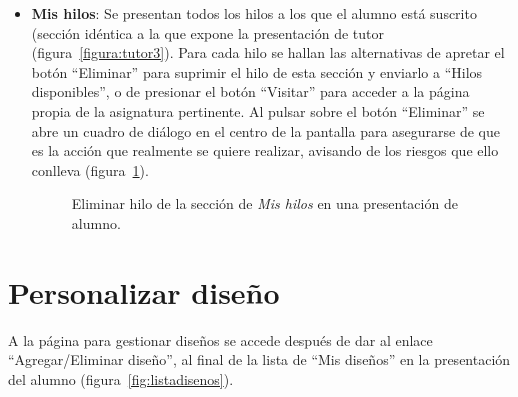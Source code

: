 \documentclass[a4paper, 12pt]{book}
\begin{document}
\begin{itemize}
  \item {\bfseries Mis hilos}: Se presentan todos los hilos a los que el alumno est\'a suscrito (secci\'on id\'entica a la que expone la presentaci\'on de 
  tutor (figura~\ref{figura:tutor3}). Para cada hilo se hallan las alternativas de apretar el bot\'on ``Eliminar'' para suprimir el hilo de esta secci\'on y 
  enviarlo a ``Hilos disponibles'', o de presionar el bot\'on ``Visitar'' para acceder a la p\'agina propia de la asignatura pertinente. Al pulsar sobre el 
  bot\'on ``Eliminar'' se abre un cuadro de di\'alogo en el centro de la pantalla para asegurarse de que es la acci\'on que realmente se quiere realizar, 
  avisando de los riesgos que ello conlleva (figura~\ref{figura:alumno3}).
  \begin{figure}[htbp] 
    \centering
    \caption{Eliminar hilo de la secci\'on de \textit{Mis hilos} en una presentaci\'on de alumno.}
    \label{figura:alumno3}
  \end{figure}
\end{itemize} 

\section{Personalizar dise\~no}
\label{app:presentacionalumno}
A la p\'agina para gestionar dise\~nos se accede despu\'es de dar al enlace ``Agregar/Eliminar dise\~no'', al final de la lista de ``Mis dise\~nos'' en la 
presentaci\'on del alumno (figura~\ref{fig:listadisenos}).
\end{document}
